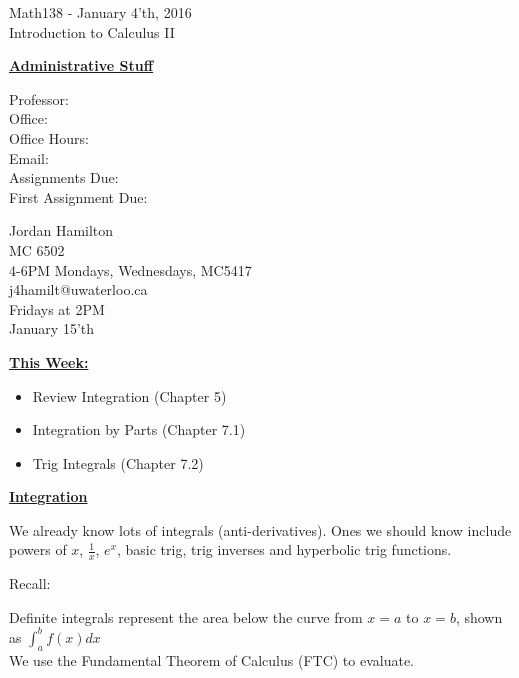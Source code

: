 \documentclass{letter}
\begin{document}
	\begin{center}
		\LARGE Math138 - January 4'th, 2016\\
		\large Introduction to Calculus II
	\end{center}
	\vspace{0.25 in}
	
	\underline{\textbf{Administrative Stuff}}
	
	\begin{minipage}[t]{0.2\textwidth}
		Professor:\\
		Office:\\
		Office Hours:\\
		Email:\\
		Assignments Due:\\
		First Assignment Due:\\
	\end{minipage}
	\begin{minipage}[t]{0.8\textwidth}
		Jordan Hamilton\\
		MC 6502\\
		4-6PM Mondays, Wednesdays, MC5417\\
		j4hamilt@uwaterloo.ca\\
		Fridays at 2PM\\
		January 15'th
	\end{minipage}
	
	\underline{\textbf{This Week:}}
	\begin{itemize}
		\item Review Integration (Chapter 5)
		\item Integration by Parts (Chapter 7.1)
		\item Trig Integrals (Chapter 7.2)
	\end{itemize}
	
	\underline{\textbf{Integration}}
	
	We already know lots of integrals (anti-derivatives). Ones we should know include powers of $x$, $\frac{1}{x}$, $e^x$, basic trig, trig inverses and hyperbolic trig functions.
	
	\begin{minipage}[t]{0.1\textwidth}
		Recall:\\
	\end{minipage}
	\begin{minipage}[t]{0.8\textwidth}
		Definite integrals represent the area below the curve from $x=a$ to $x=b$, shown as $\displaystyle \int_a^b f(x) dx$\\
		We use the Fundamental Theorem of Calculus (FTC) to evaluate.
	\end{minipage}
	
\end{document}
